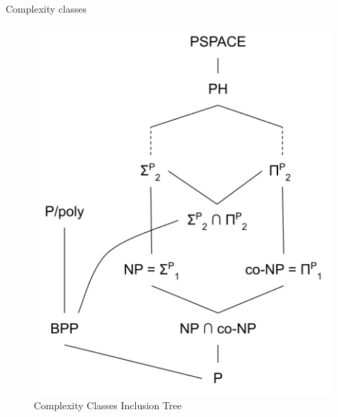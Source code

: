         \begin{frame}{Complexity classes}            
            \begin{figure}
                \centering
                \includegraphics[scale=0.5]{images/PH2.png}
                \caption{Complexity Classes Inclusion Tree}
                \label{fig:focuslogo}
            \end{figure}
        \end{frame}